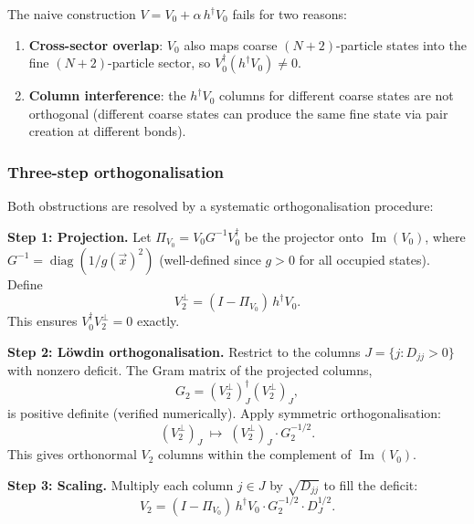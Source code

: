 The naive construction $V = V_0 + \alpha\, h^\dagger V_0$ fails for two reasons:
\begin{enumerate}
    \item \textbf{Cross-sector overlap}: $V_0$ also maps coarse $(N{+}2)$-particle states into the fine $(N{+}2)$-particle sector, so $V_0^\dagger (h^\dagger V_0) \neq 0$.
    \item \textbf{Column interference}: the $h^\dagger V_0$ columns for different coarse states are not orthogonal (different coarse states can produce the same fine state via pair creation at different bonds).
\end{enumerate}

\subsubsection{Three-step orthogonalisation}

Both obstructions are resolved by a systematic orthogonalisation procedure:

\medskip\noindent
\textbf{Step 1: Projection.} Let $\Pi_{V_0} = V_0 G^{-1} V_0^\dagger$ be the projector onto $\operatorname{Im}(V_0)$, where $G^{-1} = \operatorname{diag}(1/g(\vec{x})^2)$ (well-defined since $g > 0$ for all occupied states). Define
\begin{equation}
    V_2^{\perp} = (I - \Pi_{V_0})\, h^\dagger V_0.
\end{equation}
This ensures $V_0^\dagger V_2^{\perp} = 0$ exactly.

\medskip\noindent
\textbf{Step 2: L\"owdin orthogonalisation.} Restrict to the columns $J = \{j : D_{jj} > 0\}$ with nonzero deficit. The Gram matrix of the projected columns,
\begin{equation}
    G_2 = (V_2^{\perp})_J^\dagger (V_2^{\perp})_J,
\end{equation}
is positive definite (verified numerically). Apply symmetric orthogonalisation:
\begin{equation}
    (V_2^{\perp})_J \;\longmapsto\; (V_2^{\perp})_J \cdot G_2^{-1/2}.
\end{equation}
This gives orthonormal $V_2$ columns within the complement of $\operatorname{Im}(V_0)$.

\medskip\noindent
\textbf{Step 3: Scaling.} Multiply each column $j \in J$ by $\sqrt{D_{jj}}$ to fill the deficit:
\begin{equation}
\label{eq:V2-formula}
    V_2 = (I - \Pi_{V_0})\, h^\dagger V_0 \cdot G_2^{-1/2} \cdot D_J^{1/2}.
\end{equation}

